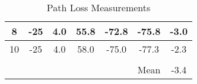 \begin{table}[H]
\begin{tabular}{ccccccc}
\multicolumn{1}{|c|}{8}                                                    & \multicolumn{1}{c|}{-25}                                                    & \multicolumn{1}{c|}{4.0}                                                           & \multicolumn{1}{c|}{55.8}                                                                & \multicolumn{1}{c|}{-72.8}                                                           & \multicolumn{1}{c|}{-75.8}                                                    & \multicolumn{1}{c|}{-3.0}                                                  \\ \hline
    \multicolumn{1}{|c|}{10}                                                   & \multicolumn{1}{c|}{-25}                                                    & \multicolumn{1}{c|}{4.0}                                                           & \multicolumn{1}{c|}{58.0}                                                                & \multicolumn{1}{c|}{-75.0}                                                           & \multicolumn{1}{c|}{-77.3}                                                    & \multicolumn{1}{c|}{-2.3}                                                  \\ \hline
                                                                           &                                                                             &                                                                                    &                                                                                          &                                                                                      &                                                                               &                                                                            \\ \cline{6-7} 
                                                                           &                                                                             &                                                                                    &                                                                                          & \multicolumn{1}{c|}{}                                                                & \multicolumn{1}{c|}{Mean}                                                     & \multicolumn{1}{c|}{-3.4}                                                  \\ \cline{6-7} 
\end{tabular}
\caption{Path Loss Measurements}
\label{tab:LinkBudgetMeas}
\end{table}

